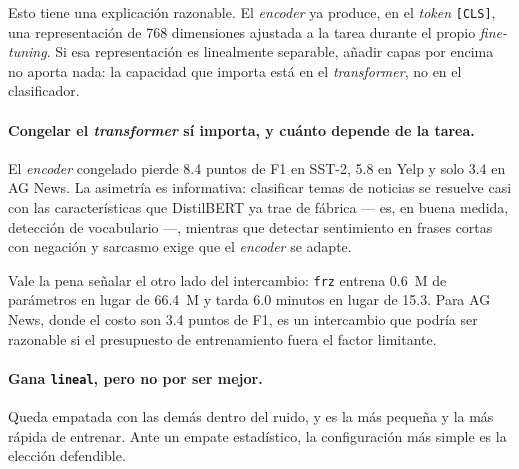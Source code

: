 Esto tiene una explicación razonable. El \textit{encoder} ya produce, en el
\textit{token} \texttt{[CLS]}, una representación de 768 dimensiones ajustada
a la tarea durante el propio \textit{fine-tuning}. Si esa representación es
linealmente separable, añadir capas por encima no aporta nada: la capacidad
que importa está en el \textit{transformer}, no en el clasificador.

\paragraph{Congelar el \textit{transformer} sí importa, y cuánto depende de la
tarea.} El \textit{encoder} congelado pierde \num{8,4} puntos de F1 en SST-2,
\num{5,8} en Yelp y solo \num{3,4} en AG News. La asimetría es informativa:
clasificar temas de noticias se resuelve casi con las características que
DistilBERT ya trae de fábrica --- es, en buena medida, detección de
vocabulario ---, mientras que detectar sentimiento en frases cortas con
negación y sarcasmo exige que el \textit{encoder} se adapte.

Vale la pena señalar el otro lado del intercambio: \texttt{frz} entrena
\num{0,6}~M de parámetros en lugar de \num{66,4}~M y tarda \num{6,0} minutos
en lugar de \num{15,3}. Para AG News, donde el costo son \num{3,4} puntos de
F1, es un intercambio que podría ser razonable si el presupuesto de
entrenamiento fuera el factor limitante.

\paragraph{Gana \texttt{lineal}, pero no por ser mejor.} Queda empatada con
las demás dentro del ruido, y es la más pequeña y la más rápida de entrenar.
Ante un empate estadístico, la configuración más simple es la elección
defendible.
